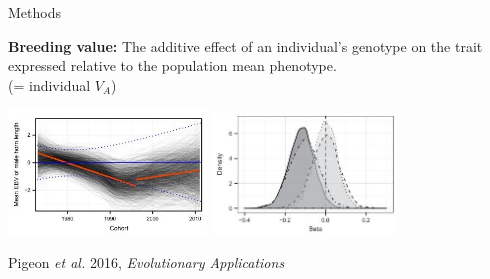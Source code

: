 \documentclass[compress]{beamer}
\begin{document}
\begin{frame}{Methods}


 \vspace{0.5cm}
 
 

 \textbf{Breeding value:} The additive effect of an individual’s genotype on the trait expressed relative to the population mean phenotype. \\(= individual $V_A$) \\ %
 \vspace{0.1cm}
 
 \centering
 \includegraphics[height = 3.3cm]{Image/Illustration/Pigeon 2016.JPG}
  \includegraphics[height = 3.2cm]{Image/Illustration/Pigeon 2016 2.JPG}
\vspace{0.1cm}
 
 \raggedleft
\tiny
Pigeon \textit{et al.} 2016, \textit{Evolutionary Applications}\\

 
 \end{frame}
 
\end{document}
